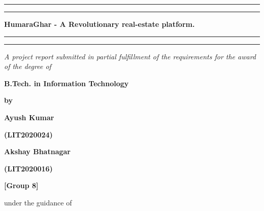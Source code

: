 \thispagestyle{empty}

\setcounter{page}{1}

\def\thepage{\roman{page}}

\begin{center}

    \rule[0.5ex]{\linewidth}{2pt}\vspace*{-\baselineskip}\vspace*{3.2pt}
    \rule[0.5ex]{\linewidth}{2pt}

    \vspace*{3.2pt}

    {\Large\bf HumaraGhar - A Revolutionary real-estate platform.}

    \vspace*{3.2pt}

    \rule[0.5ex]{\linewidth}{2pt}\vspace*{-\baselineskip}\vspace*{3.2pt}
    \rule[0.5ex]{\linewidth}{2pt}

    \vspace{1.5cm}

    \textit{{A project report submitted in partial fulfillment of the requirements
                for the award of the degree of}}

    \vspace{1cm}

    {\bf B.Tech. in Information Technology}

    \vspace{0.5cm}

    {\bf by}

    \vspace{0.5cm}

    {\bf {Ayush Kumar}}

    \vspace{0.1cm}

    {\bf {(LIT2020024)}}

    \vspace{0.2cm}

    {\bf {Akshay Bhatnagar}}

    \vspace{0.1cm}

    {\bf {(LIT2020016)}}

    \vspace{0.1cm}

    {\bf {[Group 8]}}

    \vspace{1.1cm}

    {under the guidance of}


\end{center}
